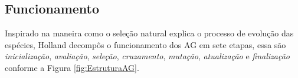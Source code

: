 \subsection{Funcionamento}
 
Inspirado na maneira como o seleção natural explica o processo de evolução das espécies, Holland \cite{Holland1975} decompôs o funcionamento dos AG em sete etapas, essa são \textit{inicialização}, \textit{avaliação}, \textit{seleção}, \textit{cruzamento}, \textit{mutação}, \textit{atualização} e  \textit{finalização} conforme a Figura \ref{fig:EstruturaAG}. 

\begin{minipage}{\linewidth}
	\label{fig:EstruturaAG}
\end{minipage}


